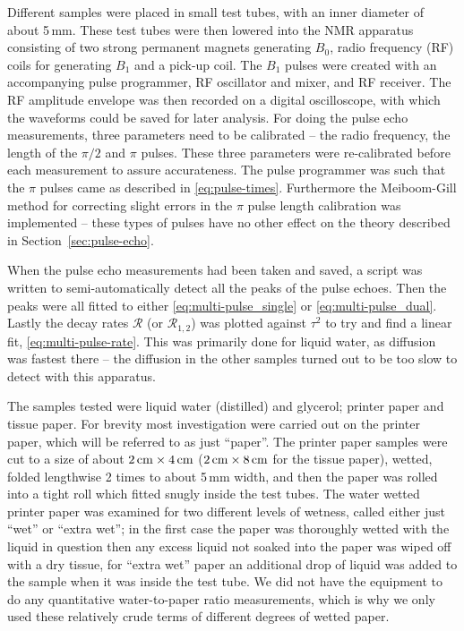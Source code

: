 \documentclass[11pt,a4paper, twocolumn,
swedish, english %
]{article}
\begin{document}
Different samples were placed in small test tubes, with an inner
diameter of about 5\,mm. These test tubes were then lowered into the
NMR apparatus consisting of two strong permanent magnets generating
$B_0$, radio frequency (RF) coils for generating $B_1$ and a pick-up
coil. The $B_1$ pulses were created with an accompanying pulse
programmer, RF oscillator and mixer, and RF receiver. The RF amplitude
envelope was then recorded on a digital oscilloscope, with which the
waveforms could be saved for later analysis. 
For doing the pulse echo measurements, three parameters need to be
calibrated -- the radio frequency, the length of the $\pi/2$ and $\pi$
pulses. These three parameters were re-calibrated before each
measurement to assure accurateness. The pulse programmer was such that
the $\pi$ pulses came as described in
\eqref{eq:pulse-times}. Furthermore the
Meiboom-Gill\cite{Meiboom-Gill1958} method for correcting slight
errors in the $\pi$ pulse length calibration was implemented -- these
types of pulses have no other effect on the theory described in
Section~\ref{sec:pulse-echo}. 

When the pulse echo measurements had been taken and saved, a script
was written to semi-automatically detect all the peaks
of the pulse echoes. Then the peaks were all fitted to either
\eqref{eq:multi-pulse_single} or \eqref{eq:multi-pulse_dual}.
Lastly the decay rates $\mathcal{R}$ (or $\mathcal{R}_{1, 2}$) was
plotted against $\tau^2$ to try and find a linear fit,
\eqref{eq:multi-pulse-rate}.\footnotemark{} 
This was primarily done for liquid water, as diffusion was fastest
there -- the diffusion in the other samples turned out to be too slow
to detect with this apparatus. 


The samples tested were liquid water (distilled) and glycerol; 
printer paper and tissue paper. For brevity most investigation were
carried out on the printer paper, which will be referred to as just
``paper''. The printer paper samples were cut to a size of about  
$\unit[2]{cm}\times\unit[4]{cm}$ ($\unit[2]{cm}\times\unit[8]{cm}$ for
the tissue paper), wetted, folded lengthwise 2 times to about 5\,mm
width, and then the paper was rolled into a tight roll which fitted
snugly inside the test tubes.
The water wetted printer paper was examined for two different levels of
wetness, called either just ``wet'' or ``extra wet''; in the first
case the paper was thoroughly wetted with the liquid in question then
any excess liquid not soaked into the paper was wiped off with a dry
tissue, for ``extra wet'' paper an additional drop of liquid was added
to the sample when it was inside the test tube. We did not have the
equipment to do any quantitative water-to-paper ratio measurements,
which is why we only used these relatively crude terms of different
degrees of wetted paper.
\end{document}
